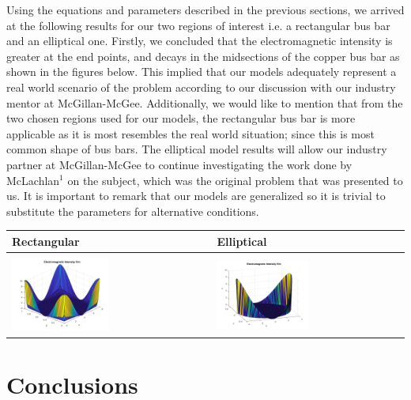 \documentclass[11pt]{article}
\begin{document}
Using the equations and parameters described in the previous sections,
we arrived at the following results for our two regions of interest
i.e. a rectangular bus bar and an elliptical one. Firstly, we concluded
that the electromagnetic intensity is greater at the end points, and
decays in the midsections of the copper bus bar as shown in the figures
below. This implied that our models adequately represent a real world
scenario of the problem according to our discussion with our industry
mentor at McGillan-McGee. Additionally, we would like to mention that
from the two chosen regions used for our models, the rectangular bus bar
is more applicable as it is most resembles the real world situation;
since this is most common shape of bus bars. The elliptical model
results will allow our industry partner at McGillan-McGee to continue
investigating the work done by McLachlan$^1$ on the subject, which was
the original problem that was presented to us. It is important to remark
that our models are generalized so it is trivial to substitute the
parameters for alternative conditions.
\newpage
\begin{longtable}[]{@{}ll@{}}
\toprule
Rectangular & Elliptical \\
\midrule
\endhead
& \\
\includegraphics[width=0.5\textwidth]{rect.png} & \includegraphics[width=0.5\textwidth]{ellip.png}\\
\bottomrule
\end{longtable}

\section{Conclusions}
\end{document}
